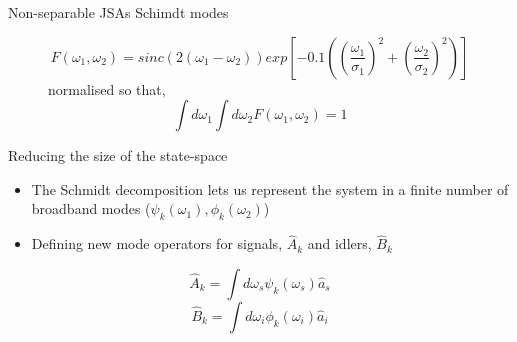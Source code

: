 \documentclass{beamer}
\renewcommand{\annia}{\hat{a}}
\begin{document}
\begin{frame}{Non-separable JSAs Schimdt modes}
\begin{figure}
    \begin{equation}
        F(\omega_1,\omega_2) = sinc(2(\omega_1-\omega_2))exp\left[-0.1 \left( \left(\frac{\omega_1}{\sigma_1} \right)^2+\left(\frac{\omega_2}{\sigma_2} \right)^2 \right) \right]
    \end{equation}
    \vspace{-5pt}
    normalised so that,
    \begin{equation}
    \int d\omega_1 \int d\omega_2 F(\omega_1,\omega_2) = 1
    \end{equation}
    \end{figure}

\end{frame} 

\begin{frame}{Reducing the size of the state-space}
    \begin{itemize}
        \item The Schmidt decomposition lets us represent the system in a finite number of broadband modes ($\psi_k(\omega_1), \phi_k(\omega_2)$) \cite{wasilewski2006pulsed}
        \item Defining new mode operators for signals, $\hat{A}_k$ and idlers, $\hat{B}_k$

    \end{itemize}
    \begin{equation}
    \hat{A}_k = \int d\omega_s \psi_k(\omega_s) \annia_s
    \end{equation}
    \begin{equation}
    \hat{B}_k = \int d\omega_i \phi_k(\omega_i) \annia_i
    \end{equation}
\end{frame}
\end{document}
